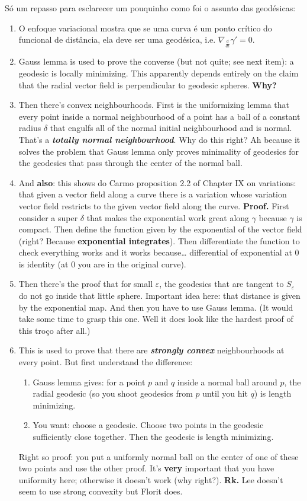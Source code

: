 Só um repasso para esclarecer um pouquinho como foi o assunto das geodésicas:
\begin{enumerate}
\item O enfoque variacional mostra que se uma curva é um ponto crítico do funcional de distância, ela deve ser uma geodésica, i.e. \(\nabla_{\frac{d}{dt}}\gamma'=0\).
\item Gauss lemma is used to prove the converse (but not quite; see next item): a geodesic is locally minimizing. This apparently depends entirely on the claim that the radial vector field is perpendicular to geodesic spheres. \textbf{Why?} 
\item Then there's convex neighbourhoods. First is the uniformizing lemma that every point inside a normal neighbourhood of a point has a ball of a constant radius \(\delta\) that engulfs all of the normal initial neighbourhood and is normal. That's a \textit{\textbf{totally normal neighbourhood}}. Why do this right? Ah because it solves the problem that Gauss lemma only proves minimality of geodesics for the geodesics that pass through the center of the normal ball.
		\item And \textbf{also}: this shows do Carmo proposition 2.2 of Chapter IX on variations: that given a vector field along a curve there is a variation whose variation vector field restricts to the given vector field along the curve. \textbf{Proof.} First consider a super \(\delta\) that makes the exponential work great along \(\gamma\) because \(\gamma\) is compact. Then define the function given by the exponential of the vector field (right? Because \textbf{exponential integrates}). Then differentiate the function to check everything works and it works because… differential of exponential at 0 is identity (at 0 you are in the original curve).
\item Then there's the proof that for small \(\varepsilon\), the geodesics that are tangent to \(S_\varepsilon\) do not go inside that little sphere. Important idea here: that distance is given by the exponential map. And then you have to use Gauss lemma. (It would take some time to grasp this one. Well it does look like the hardest proof of this troço after all.)
\item This is used to prove that there are \textit{\textbf{strongly convex}} neighbourhoods at every point. But first understand the difference:
	\begin{enumerate}
	\item Gauss lemma gives: for a point \(p\) and \(q\) inside a normal ball around \(p\), the radial geodesic (so you shoot geodesics from \(p\) until you hit \(q\)) is length minimizing.
	\item You want: choose a geodesic. Choose two points in the geodesic sufficiently close together. Then the geodesic is length minimizing.
	\end{enumerate}
	Right so proof: you put a uniformly normal ball on the center of one of these two points and use the other proof. It's \textbf{very} important that you have uniformity here; otherwise it doesn't work (why right?). \textbf{Rk.} Lee doesn't seem to use strong convexity but Florit does.
\end{enumerate}


